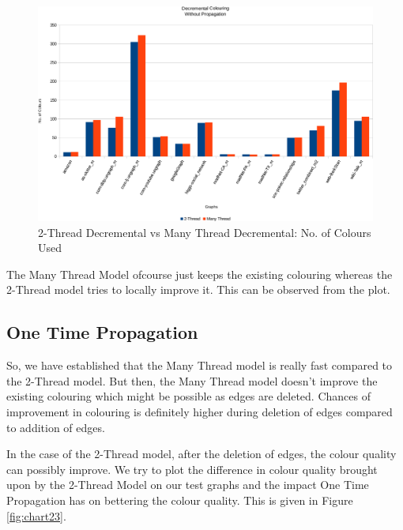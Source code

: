 \documentclass[MTech]{iitmdiss}
\begin{document}
\begin{figure}[h]
    \centering
    \includegraphics[width=\textwidth,keepaspectratio=true]{chartNewest26.pdf}
    \caption{
        2-Thread Decremental vs Many Thread Decremental: No. of Colours Used
    }
    \label{fig:chart22}
\end{figure}

The Many Thread Model ofcourse just keeps the existing colouring whereas the 2-Thread model tries to locally improve it. This can be observed from the plot. 

\subsection{One Time Propagation}
So, we have established that the Many Thread model is really fast compared to the 2-Thread model. But then, the Many Thread model doesn't improve the existing colouring which might be possible as edges are deleted. Chances of improvement in colouring is definitely higher during deletion of edges compared to addition of edges.

In the case of the 2-Thread model, after the deletion of edges, the colour quality can possibly improve. We try to plot the difference in colour quality brought upon by the 2-Thread Model on our test graphs and the impact One Time Propagation has on bettering the colour quality. This is given in Figure \ref{fig:chart23}.
\end{document}
